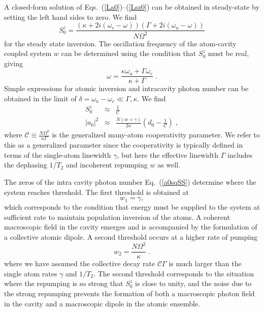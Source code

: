 \documentclass[aps,
twocolumn,
showpacs,
superscriptaddress,groupedaddress]{revtex4}
\begin{document}
A closed-form solution of Eqs.~(\ref{La0})--(\ref{Lsz0}) can be
obtained in steady-state by setting the left hand sides to zero.  We
find
\begin{equation}
S_0^{z}=
\frac{(\kappa+2i(\omega_c-\omega))(\Gamma+2i(\omega_a-\omega))}{N\Omega^2}
\label{Sz01}
\end{equation}
for the steady state inversion. The oscillation frequency of the
atom-cavity coupled system $w$ can be determined using the condition
that $S_0^{z}$ must be real, giving
\begin{equation}
\omega = \frac{\kappa \omega_a + \Gamma \omega_c}{\kappa+\Gamma}\;.
\label{atomcavityfrequencycenter1}
\end{equation}
Simple expressions for atomic inversion and intracavity photon number
can be obtained in the limit of
$\delta = \omega_a-\omega_c \ll \Gamma,\kappa$. We find
\begin{eqnarray}
  S_0^{z}&\approx& \frac{1}{\mathcal{C}}\nonumber\\
  |a_0|^2&\approx&\frac{N(w+\gamma)}{2 \kappa}
             \left(d_0 - \frac{1}{\mathcal{C}}\right)\;,
\label{a0sqSS}
\end{eqnarray}
where $\mathcal{C}\equiv \frac{N \Omega^2}{\kappa \Gamma}$ is the
generalized many-atom cooperativity parameter. We refer to this as a
generalized parameter since the cooperativity is typically defined in
terms of the single-atom linewidth $\gamma$, but here the effective
linewidth $\Gamma$ includes the dephasing $1/T_2$ and incoherent
repumping $w$ as well.


The zeros of the intra cavity photon number Eq.~(\ref{a0sqSS})
determine where the system reaches threshold. The first threshold
is obtained at
\begin{equation}
w_1 = \gamma,
\label{FirstThreshold}
\end{equation}
which corresponds to the condition that energy must be supplied to the
system at sufficient rate to maintain population inversion of the
atoms. A coherent macroscopic field in the cavity emerges and is
accompanied by the formulation of a collective atomic dipole. A second
threshold occurs at a higher rate of pumping
\begin{equation}
w_2 =  \frac{N \Omega^2}{\kappa}\;.
\end{equation} 
where we have assumed the collective decay rate $\mathcal{C}\Gamma$ is
much larger than the single atom rates $\gamma$ and $1/T_2$. The
second threshold corresponds to the situation where the repumping is
so strong that $S_0^{z}$ is close to unity, and the noise due to the
strong repumping prevents the formation of both a macroscopic photon
field in the cavity and a macroscopic dipole in the atomic ensemble.
\end{document}
